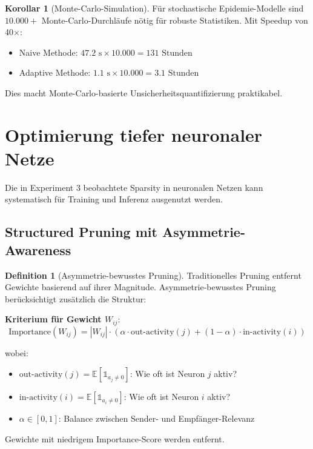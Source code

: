﻿\documentclass[a4paper,12pt]{report}
\theoremstyle{definition}
\newtheorem{definition}{Definition}
\newtheorem{korollar}{Korollar}
\begin{document}
	\begin{korollar}[Monte-Carlo-Simulation]
		Für stochastische Epidemie-Modelle sind $10.000+$ Monte-Carlo-Durchläufe nötig für robuste Statistiken. Mit Speedup von 40$\times$:
		\begin{itemize}
			\item Naive Methode: $47.2 \text{ s} \times 10.000 = 131 \text{ Stunden}$
			\item Adaptive Methode: $1.1 \text{ s} \times 10.000 = 3.1 \text{ Stunden}$
		\end{itemize}
		
		Dies macht Monte-Carlo-basierte Unsicherheitsquantifizierung praktikabel.
	\end{korollar}
	
	\section{Optimierung tiefer neuronaler Netze}
	
	Die in Experiment 3 beobachtete Sparsity in neuronalen Netzen kann systematisch für Training und Inferenz ausgenutzt werden.
	
	\subsection{Structured Pruning mit Asymmetrie-Awareness}
	
	\begin{definition}[Asymmetrie-bewusstes Pruning]
		Traditionelles Pruning entfernt Gewichte basierend auf ihrer Magnitude. Asymmetrie-bewusstes Pruning berücksichtigt zusätzlich die Struktur:
		
		\textbf{Kriterium für Gewicht $W_{ij}$}:
		\[
		\text{Importance}(W_{ij}) = |W_{ij}| \cdot \left( \alpha \cdot \text{out-activity}(j) + (1-\alpha) \cdot \text{in-activity}(i) \right)
		\]
		
		wobei:
		\begin{itemize}
			\item $\text{out-activity}(j) = \mathbb{E}[\mathbb{1}_{a_j \neq 0}]$: Wie oft ist Neuron $j$ aktiv?
			\item $\text{in-activity}(i) = \mathbb{E}[\mathbb{1}_{a_i \neq 0}]$: Wie oft ist Neuron $i$ aktiv?
			\item $\alpha \in [0,1]$: Balance zwischen Sender- und Empfänger-Relevanz
		\end{itemize}
		
		Gewichte mit niedrigem Importance-Score werden entfernt.
	\end{definition}
	
\end{document}
